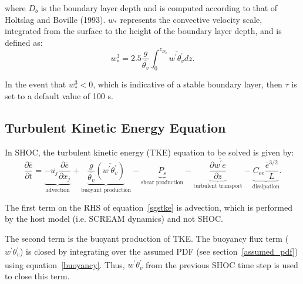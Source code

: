 where $D_{b}$ is the boundary layer depth and is computed according to that of Holtslag and Boville (1993).  $w_{*}$ represents the convective velocity scale, integrated from the surface to the height of the boundary layer depth, and is defined as:
%
\begin{equation}
  w_{*}^{3}=2.5\frac{g}{\overline{\theta_{v}}} \int_{0}^{z_{D_{b}}} \overline{w^{'}\theta_{v}^{'}} dz .   
  \label{wstar_pbl}
\end{equation}

In the event that $w_{*}^{3} < 0$, which is indicative of a stable boundary layer, then $\tau$ is set to a default value of 100 s.  

\subsection{Turbulent Kinetic Energy Equation}
\label{tke_equation}

In SHOC, the turbulent kinetic energy (TKE) equation to be solved is given by:
%
\begin{equation}
  \frac{\partial{\overline{e}}}{\partial{t}}=\underbrace{-\overline{u_{j}}\frac{\partial{\overline{e}}}{\partial{x_{j}}}}_\text{advection}+\underbrace{\frac{g}{\overline{\theta_{v}}}\left(\overline{w^{'}\theta_{v}^{'}}\right)}_\text{buoyant production}-\underbrace{P_{s}}_\text{shear production}-\underbrace{\frac{\partial{\overline{w^{'}e}}}{\partial{z}}}_\text{turbulent transport}-\underbrace{C_{ee}\frac{\overline{e}^{3/2}}{L}}_\text{dissipation} .  
  \label{sgstke}
\end{equation}

The first term on the RHS of equation~\ref{sgstke} is advection, which is performed by the host model (i.e. SCREAM dynamics) and not SHOC.  

The second term is the buoyant production of TKE.  The buoyancy flux term ($\overline{w^{'}\theta_{v}^{'}}$) is closed by integrating over the assumed PDF (see section~\ref{assumed_pdf}) using equation~\ref{buoyancy}.  Thus, $\overline{w^{'}\theta_{v}^{'}}$ from the previous SHOC time step is used to close this term.  

